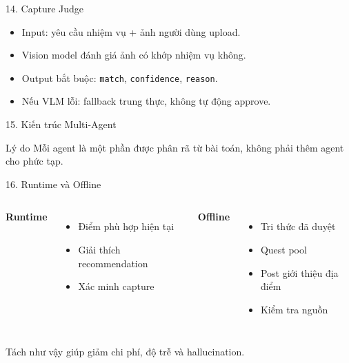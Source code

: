\documentclass[aspectratio=169]{beamer}
\begin{document}
\begin{frame}{14. Capture Judge}
\begin{itemize}
    \item Input: yêu cầu nhiệm vụ + ảnh người dùng upload.
    \item Vision model đánh giá ảnh có khớp nhiệm vụ không.
    \item Output bắt buộc: \texttt{match}, \texttt{confidence}, \texttt{reason}.
    \item Nếu VLM lỗi: fallback trung thực, không tự động approve.
\end{itemize}
\end{frame}

\begin{frame}{15. Kiến trúc Multi-Agent}
\vspace{0.25cm}
\begin{block}{Lý do}
Mỗi agent là một phần được phân rã từ bài toán, không phải thêm agent cho phức tạp.
\end{block}
\end{frame}

\begin{frame}{16. Runtime và Offline}
\begin{columns}
\textbf{Runtime}
\begin{itemize}
    \item Điểm phù hợp hiện tại
    \item Giải thích recommendation
    \item Xác minh capture
\end{itemize}
\textbf{Offline}
\begin{itemize}
    \item Tri thức đã duyệt
    \item Quest pool
    \item Post giới thiệu địa điểm
    \item Kiểm tra nguồn
\end{itemize}
\end{columns}
\vspace{0.25cm}
Tách như vậy giúp giảm chi phí, độ trễ và hallucination.
\end{frame}
\end{document}
